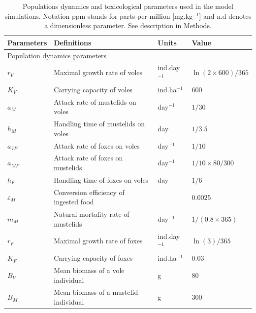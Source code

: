 \documentclass[11pt]{article}
\begin{document}

%

%



\newpage


\begin{table}
\caption{Populations dynamics and toxicological parameters used in the model simulations. Notation ppm stands for parts-per-million [mg.kg$^{-1}$] and n.d denotes a dimensionless parameter. See description in Methods.}
\label{tab:parameterization}
\begin{tabular}{l p{7cm} l p{3cm}}
\hline
Parameters & Definitions & Units & Value\\
\hline
\multicolumn{2}{l}{Population dynamics parameters}  & & \\
\hline
%
$r_V$ & Maximal growth rate of voles & ind.day$^{-1}$ & $\ln(2\times600)/365$ \\
$K_V$ & Carrying capacity of voles & ind.ha$^{-1}$ & $600$  \\
%
%
$a_M$ & Attack rate of mustelids on voles & day$^{-1}$ & $1/30$ \\
$h_M$ &  Handling time of mustelids on voles & day & $1/3.5$\\
$a_{VF}$ & Attack rate of foxes on voles & day$^{-1}$ & $1/10$ \\
$a_{MF}$ & Attack rate of foxes on mustelids & day$^{-1}$ & $1/10 \times 80/300$ \\
$h_F$ &  Handling time of foxes on voles & day & $1/6$\\
%
%
$\varepsilon_M$ & Conversion efficiency of ingested food & & $0.0025$ \\
$m_M$ & Natural mortality rate of mustelids & day$^{-1}$ & $1/(0.8 \times 365)$\\
%
%
$r_F$ & Maximal growth rate of foxes & ind.day$^{-1}$ & $\ln(3)/365$ \\
$K_F$ & Carrying capacity of foxes & ind.ha$^{-1}$ & $0.03$ \\
%
%
$B_V$ & Mean biomass of a vole individual & g & $80$ \\
$B_M$ & Mean biomass of a mustelid individual & g & $300$ \\

\end{tabular}
\end{table}
\end{document}
